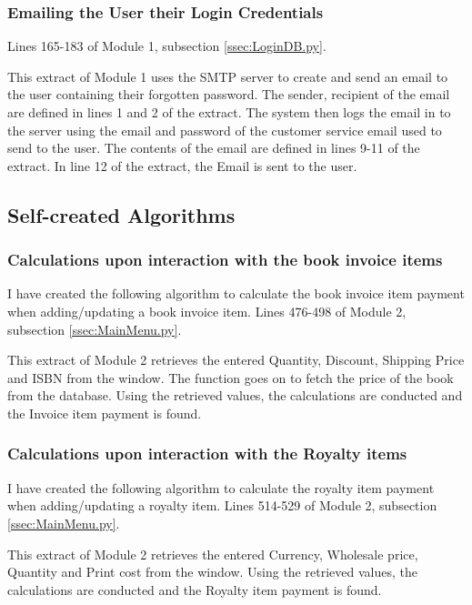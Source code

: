 \subsubsection{Emailing the User their Login Credentials}
Lines 165-183 of Module 1, subsection \ref{ssec:LoginDB.py}.
\begin{tiny}
\end{tiny}
This extract of Module 1 uses the SMTP server to create and send an email to the user containing their forgotten password. The sender, recipient of the email are defined in lines 1 and 2 of the extract. The system then logs the email in to the server using the email and password of the customer service email used to send to the user. The contents of the email are defined in lines 9-11 of the extract. In line 12 of the extract, the Email is sent to the user.

\subsection{Self-created Algorithms}

\subsubsection{Calculations upon interaction with the book invoice items}
I have created the following algorithm to calculate the book invoice item payment when adding/updating a book invoice item.
Lines 476-498 of Module 2, subsection \ref{ssec:MainMenu.py}.
\begin{tiny}
\end{tiny}
This extract of Module 2 retrieves the entered Quantity, Discount, Shipping Price and ISBN from the window. The function goes on to fetch the price of the book from the database. Using the retrieved values, the calculations are conducted and the Invoice item payment is found.


\subsubsection{Calculations upon interaction with the Royalty items}
I have created the following algorithm to calculate the royalty item payment when adding/updating a royalty item.
Lines 514-529 of Module 2, subsection \ref{ssec:MainMenu.py}.
\begin{tiny}
\end{tiny}
This extract of Module 2 retrieves the entered Currency, Wholesale price, Quantity and Print cost from the window. Using the retrieved values, the calculations are conducted and the Royalty item payment is found.

